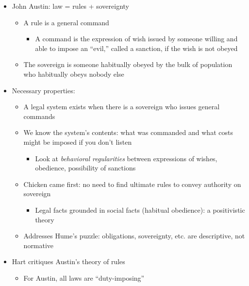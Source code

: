 \begin{itemize}
\tightlist
\item
  John Austin: law = rules + sovereignty

  \begin{itemize}
  \tightlist
  \item
    A rule is a general command

    \begin{itemize}
    \tightlist
    \item
      A command is the expression of wish issued by someone willing and
      able to impose an ``evil,'' called a sanction, if the wish is not
      obeyed
    \end{itemize}
  \item
    The sovereign is someone habitually obeyed by the bulk of population
    who habitually obeys nobody else
  \end{itemize}
\item
  Necessary properties:

  \begin{itemize}
  \tightlist
  \item
    A legal system exists when there is a sovereign who issues general
    commands
  \item
    We know the system's contents: what was commanded and what costs
    might be imposed if you don't listen

    \begin{itemize}
    \tightlist
    \item
      Look at \emph{behavioral regularities} between expressions of
      wishes, obedience, possibility of sanctions
    \end{itemize}
  \item
    Chicken came first: no need to find ultimate rules to convey
    authority on sovereign

    \begin{itemize}
    \tightlist
    \item
      Legal facts grounded in social facts (habitual obedience): a
      positivistic theory
    \end{itemize}
  \item
    Addresses Hume's puzzle: obligations, sovereignty, etc. are
    descriptive, not normative
  \end{itemize}
\item
  Hart critiques Austin's theory of rules

  \begin{itemize}
  \tightlist
  \item
    For Austin, all laws are ``duty-imposing''


\end{itemize}
\end{itemize}
